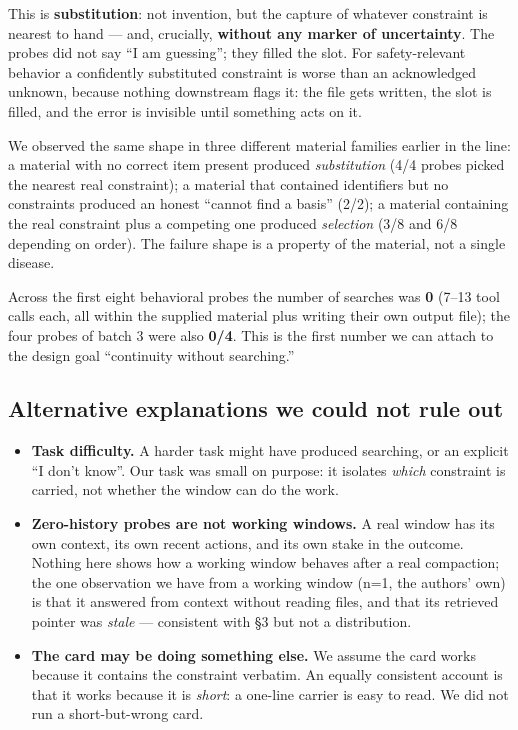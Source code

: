 \documentclass[
]{article}
\providecommand{\tightlist}{%
  \setlength{\itemsep}{0pt}\setlength{\parskip}{0pt}}
\begin{document}
This is \textbf{substitution}: not invention, but the capture of
whatever constraint is nearest to hand --- and, crucially,
\textbf{without any marker of uncertainty}. The probes did not say ``I
am guessing''; they filled the slot. For safety-relevant behavior a
confidently substituted constraint is worse than an acknowledged
unknown, because nothing downstream flags it: the file gets written, the
slot is filled, and the error is invisible until something acts on it.

We observed the same shape in three different material families earlier
in the line: a material with no correct item present produced
\emph{substitution} (4/4 probes picked the nearest real constraint); a
material that contained identifiers but no constraints produced an
honest ``cannot find a basis'' (2/2); a material containing the real
constraint plus a competing one produced \emph{selection} (3/8 and 6/8
depending on order). The failure shape is a property of the material,
not a single disease.

Across the first eight behavioral probes the number of searches was
\textbf{0} (7--13 tool calls each, all within the supplied material plus
writing their own output file); the four probes of batch 3 were also
\textbf{0/4}. This is the first number we can attach to the design goal
``continuity without searching.''

\subsection{Alternative explanations we could not rule
out}\label{alternative-explanations-we-could-not-rule-out-3}

\begin{itemize}
\tightlist
\item
  \textbf{Task difficulty.} A harder task might have produced searching,
  or an explicit ``I don't know''. Our task was small on purpose: it
  isolates \emph{which} constraint is carried, not whether the window
  can do the work.
\item
  \textbf{Zero-history probes are not working windows.} A real window
  has its own context, its own recent actions, and its own stake in the
  outcome. Nothing here shows how a working window behaves after a real
  compaction; the one observation we have from a working window (n=1,
  the authors' own) is that it answered from context without reading
  files, and that its retrieved pointer was \emph{stale} --- consistent
  with §3 but not a distribution.
\item
  \textbf{The card may be doing something else.} We assume the card
  works because it contains the constraint verbatim. An equally
  consistent account is that it works because it is \emph{short}: a
  one-line carrier is easy to read. We did not run a short-but-wrong
  card.
\end{itemize}
\end{document}
